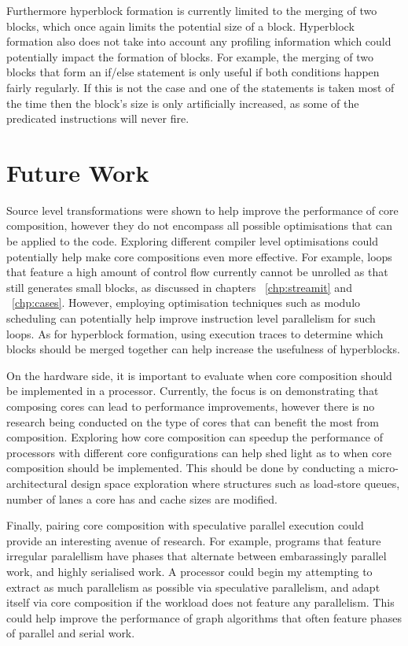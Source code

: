 Furthermore hyperblock formation is currently limited to the merging of two blocks, which once again limits the potential size of a block.
Hyperblock formation also does not take into account any profiling information which could potentially impact the formation of blocks.
For example, the merging of two blocks that form an if/else statement is only useful if both conditions happen fairly regularly.
If this is not the case and one of the statements is taken most of the time then the block's size is only artificially increased, as some of the predicated instructions will never fire.


\section{Future Work}

Source level transformations were shown to help improve the performance of core composition, however they do not encompass all possible optimisations that can be applied to the code.
Exploring different compiler level optimisations could potentially help make core compositions even more effective.
For example, loops that feature a high amount of control flow currently cannot be unrolled as that still generates small blocks, as discussed in chapters ~\ref{chp:streamit} and ~\ref{chp:cases}.
However, employing optimisation techniques such as modulo scheduling can potentially help improve instruction level parallelism for such loops.
As for hyperblock formation, using execution traces to determine which blocks should be merged together can help increase the usefulness of hyperblocks.

On the hardware side, it is important to evaluate when core composition should be implemented in a processor.
Currently, the focus is on demonstrating that composing cores can lead to performance improvements, however there is no research being conducted on the type of cores that can benefit the most from composition.
Exploring how core composition can speedup the performance of processors with different core configurations can help shed light as to when core composition should be implemented.
This should be done by conducting a micro-architectural design space exploration where structures such as load-store queues, number of lanes a core has and cache sizes are modified.

Finally, pairing core composition with speculative parallel execution could provide an interesting avenue of research.
For example, programs that feature irregular paralellism have phases that alternate between embarassingly parallel work, and highly serialised work.
A processor could begin my attempting to extract as much parallelism as possible via speculative parallelism, and adapt itself via core composition if the workload does not feature any parallelism.
This could help improve the performance of graph algorithms that often feature phases of parallel and serial work.
